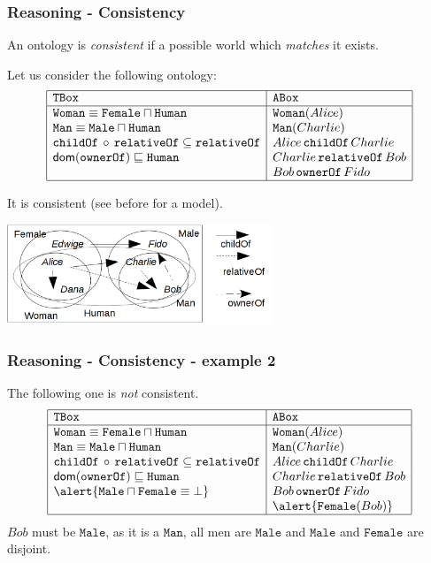 \documentclass[8pt]{beamer}
\newcommand{\TBox}{{\tt TBox}}
\newcommand{\ABox}{{\tt ABox}}
\newcommand{\Human}{\mathtt{Human}}
\newcommand{\Male}{\mathtt{Male}}
\newcommand{\Female}{\mathtt{Female}}
\newcommand{\Man}{\mathtt{Man}}
\newcommand{\Woman}{\mathtt{Woman}}
\newcommand{\relative}{\mathtt{relativeOf}}
\newcommand{\child}{\mathtt{childOf}}
\newcommand{\owner}{\mathtt{ownerOf}}
\newcommand{\Alice}{Alice}
\newcommand{\Bob}{Bob}
\newcommand{\Charlie}{Charlie}
\newcommand{\Fido}{Fido}
\begin{document}
\begin{frame}
 \frametitle{Reasoning - Consistency}
 
 An ontology is \emph{consistent} if a possible world which \emph{matches} it exists.
 \vspace{\baselineskip}
 
 Let us consider the following ontology:
 \[
  \begin{array}{|l|l|}
   \hline
   \TBox & \ABox\\
   \hline
   \Woman \equiv \Female \sqcap \Human & \Woman(\Alice)\\
   \Man \equiv \Male \sqcap \Human & \Man(\Charlie)\\
   \child\,\circ\,\relative \subseteq \relative &  \Alice\,\child\,\Charlie\\
   \dom(\owner) \Issub \Human & \Charlie\,\relative\,\Bob\\
   & \Bob\,\owner\,\Fido\\
   \hline
  \end{array}
 \]
 
 It is consistent (see before for a model).
 
\begin{center}
  \includegraphics[width=300px, keepaspectratio]{images/exbasemanwoman_big.png}  
\end{center}

\end{frame}

\begin{frame}
 \frametitle{Reasoning - Consistency - example 2}
 
 The following one is \emph{not} consistent.
 \[
  \begin{array}{|l|l|}
   \hline
   \TBox & \ABox\\
   \hline
   \Woman \equiv \Female \sqcap \Human & \Woman(\Alice)\\
   \Man \equiv \Male \sqcap \Human & \Man(\Charlie)\\
   \child\,\circ\,\relative \subseteq \relative &  \Alice\,\child\,\Charlie\\
   \dom(\owner) \Issub \Human & \Charlie\,\relative\,\Bob\\
   \alert{\Male \sqcap \Female \equiv \bot}& \Bob\,\owner\,\Fido\\
   & \alert{\Female(\Bob)}\\
   \hline
  \end{array}
 \]
 $\Bob$ must be $\Male$, as it is a $\Man$, all men are $\Male$ and $\Male$ and $\Female$ are
 disjoint.
\end{frame}
\end{document}
